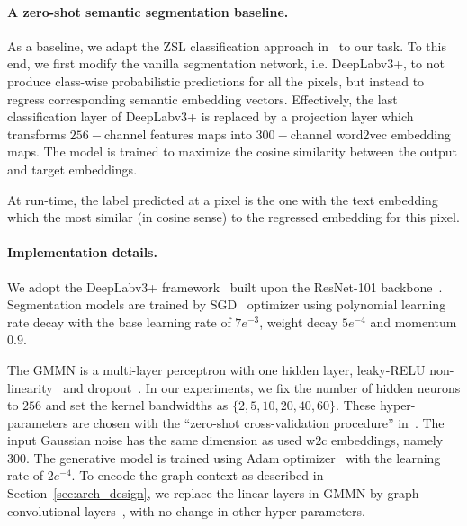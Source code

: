 \documentclass{article}
\begin{document}
\vspace{-0.3cm}
\paragraph{A zero-shot semantic segmentation baseline.}

As a baseline, we adapt the ZSL classification approach in~\cite{frome2013devise} to our task.
To this end, we first modify the vanilla segmentation network, i.e. DeepLabv3+, to not produce class-wise probabilistic predictions for all the pixels, but instead to regress corresponding semantic embedding vectors.
Effectively, the last classification layer of DeepLabv3+ is replaced by a projection layer which transforms $256-$channel features maps into $300-$channel word2vec embedding maps.
The model is trained to maximize the cosine similarity between the output and target embeddings. 

At run-time, the label predicted at a pixel is the one with the text embedding which the most similar (in cosine sense) to the regressed embedding for this pixel.


\vspace{-0.3cm}
\paragraph{Implementation details.}
We adopt the DeepLabv3+ framework~\cite{chen2018encoder} built upon the ResNet-101 backbone~\cite{he2016deep}.
Segmentation models are trained by SGD~\cite{bottou2010large} optimizer using polynomial learning rate decay with the base learning rate of $7e^{-3}$, weight decay $5e^{-4}$ and momentum $0.9$.

The GMMN is a multi-layer perceptron with one hidden layer, leaky-RELU non-linearity~\cite{maas2013rectifier} and dropout~\cite{srivastava2014dropout}.
In our experiments, we fix the number of hidden neurons to $256$ and set the kernel bandwidths as $\{2, 5, 10, 20, 40, 60\}$.
These hyper-parameters are chosen with the ``zero-shot cross-validation procedure'' in~\cite{bucher2017generating}.
The input Gaussian noise has the same dimension as used w2c embeddings, namely $300$.
The generative model is trained using Adam optimizer~\cite{kingma2014adam} with the learning rate of $2e^{-4}$.
To encode the graph context as described in Section~\ref{sec:arch_design}, we replace the linear layers in GMMN by graph convolutional layers~\cite{kipf2016semi}, with no change in other hyper-parameters.
\end{document}
